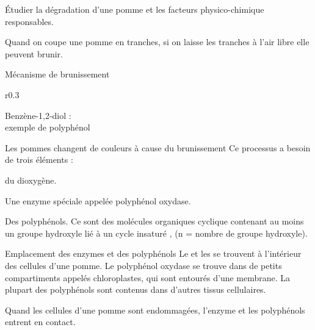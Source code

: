 \teteTermStssAlim
{}

\begin{objectifs}
  \item Étudier la dégradation d'une pomme et les facteurs physico-chimique responsables.
\end{objectifs}

\begin{contexte}
  Quand on coupe une pomme en tranches, si on laisse les tranches à l'air libre elle peuvent brunir.
  
\end{contexte}


\begin{doc}{Mécanisme de brunissement}
  \begin{wrapfigure}{r}{0.3\linewidth}
    \centering
    \vspace*{-18pt}
    \hspace{30pt}
    
    Benzène-1,2-diol : \\ exemple de polyphénol
  \end{wrapfigure}
  Les pommes changent de couleurs à cause du brunissement 
  Ce processus a besoin de trois éléments :
  \begin{listePoints}
    \item du dioxygène.
    \item Une enzyme spéciale appelée polyphénol oxydase.
    \item Des polyphénols. 
    Ce sont des molécules organiques cyclique contenant au moins un groupe hydroxyle  lié à un cycle insaturé , (n = nombre de groupe hydroxyle).
  \end{listePoints}
\end{doc}

\begin{doc}{Emplacement des enzymes et des polyphénols}
  Le  et les  se trouvent à l’intérieur des cellules d’une pomme.
  Le polyphénol oxydase se trouve dans de petits compartiments appelés chloroplastes, qui sont entourés d’une membrane.
  La plupart des polyphénols sont contenus dans d’autres tissus cellulaires.

  Quand les cellules d'une pomme sont endommagées, l'enzyme et les polyphénols entrent en contact.
\end{doc}

